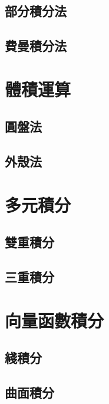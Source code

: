 \documentclass[12pt]{article}
\begin{document}
    \subsection*{部分積分法}
    \subsection*{費曼積分法}
    \section*{體積運算}
    \subsection*{圓盤法}
    \subsection*{外殼法}
    \section*{多元積分}
    \subsection*{雙重積分}
    \subsection*{三重積分}
    \section*{向量函數積分}
    \subsection*{綫積分}
    \subsection*{曲面積分}
\end{document}

